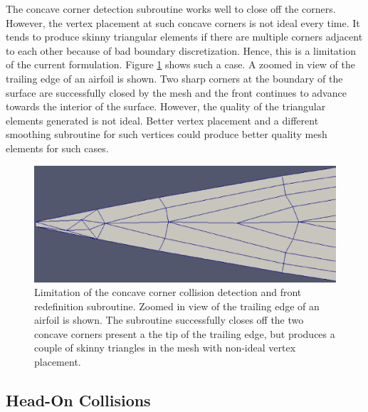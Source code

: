 The concave corner detection subroutine  works well to close off the corners. However, the vertex placement at such concave corners is not ideal every time. It tends to produce skinny triangular elements if there are multiple corners adjacent to each other because of bad boundary discretization. Hence, this is a limitation of the current formulation. Figure \ref{fig-cornerLimitation} shows such a case. A zoomed in view of the trailing edge of an airfoil is shown. Two sharp corners at the boundary of the surface are successfully closed by the mesh and the front continues to advance towards the interior of the surface. However, the quality of the triangular elements generated is not ideal. Better vertex placement and a different smoothing subroutine for such vertices could produce better quality mesh elements for such cases.

\begin{figure}
\centering
\includegraphics[width=0.4\linewidth]{img/m2/cornerCollision/cornerLimitation.eps}
\caption[Limitation of the concave corner collision detection and front redefinition subroutine.]{Limitation of the concave corner collision detection and front redefinition subroutine. Zoomed in view of the trailing edge of an airfoil is shown. The subroutine successfully closes off the two concave corners present a the tip of the trailing edge, but produces a couple of skinny triangles in the mesh with non-ideal vertex placement.}
\label{fig-cornerLimitation}
\end{figure}

\subsection{Head-On Collisions}

